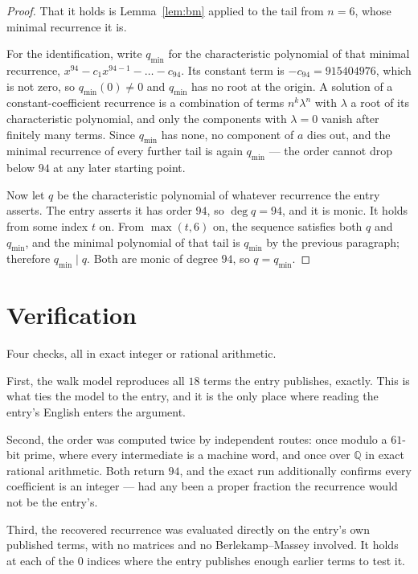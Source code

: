 \documentclass[11pt,a4paper]{article}
\theoremstyle{plain}
\theoremstyle{definition}
\begin{document}
\begin{proof}
That it holds is Lemma~\ref{lem:bm} applied to the tail from $n=6$, whose minimal
recurrence it is.

For the identification, write $q_{\min}$ for the characteristic polynomial of that minimal
recurrence, $x^{94}-c_1x^{94-1}-\dots-c_{94}$. Its constant term is
$-c_{94}=915404976$, which is not zero, so $q_{\min}(0)\neq0$ and $q_{\min}$ has no
root at the origin. A solution of a constant-coefficient recurrence is a combination of terms
$n^{k}\lambda^{n}$ with $\lambda$ a root of its characteristic polynomial, and only the
components with $\lambda=0$ vanish after finitely many terms. Since $q_{\min}$ has none, no
component of $a$ dies out, and the minimal recurrence of every further tail is again
$q_{\min}$ --- the order cannot drop below $94$ at any later starting point.

Now let $q$ be the characteristic polynomial of whatever recurrence the entry asserts. The
entry asserts it has order $94$, so $\deg q=94$, and it is monic. It holds from some
index $t$ on. From $\max(t,6)$ on, the sequence satisfies both $q$ and $q_{\min}$, and
the minimal polynomial of that tail is $q_{\min}$ by the previous paragraph; therefore
$q_{\min}\mid q$. Both are monic of degree $94$, so $q=q_{\min}$.
\end{proof}

\section{Verification}

Four checks, all in exact integer or rational arithmetic.

First, the walk model reproduces all $18$ terms the entry publishes, exactly. This is
what ties the model to the entry, and it is the only place where reading the entry's English
enters the argument.

Second, the order was computed twice by independent routes: once modulo a $61$-bit prime, where
every intermediate is a machine word, and once over $\mathbb{Q}$ in exact rational arithmetic.
Both return $94$, and the exact run additionally confirms every coefficient is an integer
--- had any been a proper fraction the recurrence would not be the entry's.

Third, the recovered recurrence was evaluated directly on the entry's own published terms, with
no matrices and no Berlekamp--Massey involved. It holds at each of the $0$ indices where
the entry publishes enough earlier terms to test it.
\end{document}
